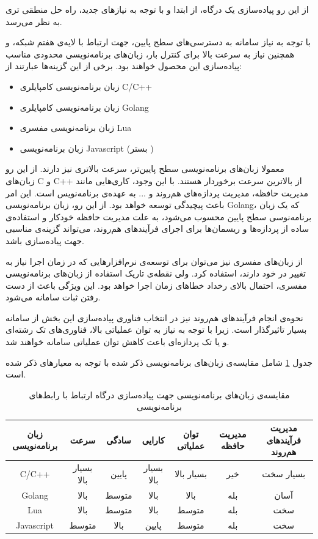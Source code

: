 از این رو پیاده‌سازی یک درگاه، از ابتدا و با توجه به نیاز‌های جدید،‌ راه حل منطقی تری به نظر می‌رسد.

با توجه به نیاز سامانه‌ به دسترسی‌های سطح پایین، جهت ارتباط با لایه‌ی هفتم شبکه، و همچنین نیاز به سرعت بالا برای کنترل بار، زبان‌های برنامه‌نویسی محدودی مناسب پیاده‌سازی این محصول خوا‌هند بود. برخی از این گزینه‌ها عبارتند از:

\begin{itemize}
    \item زبان برنامه‌نویسی کامپایلری C/C++
    \item زبان برنامه‌نویسی کامپایلری Golang
    \item زبان برنامه‌نویسی مفسری Lua
    \item زبان برنامه‌نویسی Javascript (بستر )
\end{itemize}

معمولا زبان‌های برنامه‌نویسی سطح پایین‌تر، سرعت بالاتری نیز دارند. از این رو زبان‌های C و C++ از بالاترین سرعت برخوردار هستند. با این وجود، کاری‌هایی مانند مدیریت حافظه، مدیریت پردازه‌های هم‌روند و ... به عهده‌ی برنامه‌نویس است. این امر باعث پیچیدگی توسعه خواهد بود. از این رو، زبان برنامه‌نویسی Golang، که یک زبان برنامه‌نوسی سطح‌ پایین محسوب می‌شود، به علت مدیریت حافظه خودکار و استفاده‌ی ساده از پردازه‌ها
و ریسمان‌ها
برای اجرای فرآیند‌های هم‌روند، می‌تواند گزینه‌ی مناسبی جهت پیاده‌سازی باشد.

از زبان‌های مفسری نیز می‌توان برای توسعه‌ی نرم‌افزار‌هایی که در زمان اجرا نیاز به تغییر در خود دارند، استفاده کرد. ولی نقطه‌ی تاریک استفاده ‌از زبان‌های برنامه‌نویسی مفسری، احتمال بالای رخداد خطا‌های زمان اجرا خواهد بود. این ویژگی باعث از دست رفتن ثبات سامانه می‌شود.

نحوه‌ی انجام فرآیند‌های هم‌روند نیز در انتخاب فناوری پیاده‌سازی این بخش از سامانه بسیار تاثیرگذار است. زیرا با توجه به نیاز به توان عملیاتی بالا، فناوری‌های تک رشته‌ای و یا تک‌ پردازه‌ای باعث کاهش توان عملیاتی سامانه خواهند شد.

جدول
\ref{tab:choice}
شامل مقایسه‌ی زبان‌های برنامه‌نویسی ذکر شده با توجه‌ به معیار‌های ذکر شده است.

\begin{table}[H]
    \centering
    \caption{مقایسه‌ی زبان‌های برنامه‌نویسی جهت پیاده‌سازی درگاه ارتباط با رابط‌های برنامه‌نویسی}\label{tab:choice}
    \begin{tabular}{|c|c|c|c|c|c|c|}
        \hline
        زبان برنامه‌نویسی & سرعت & سادگی & کارایی & توان عملیاتی & مدیریت حافظه & مدیریت فرآیند‌های هم‌روند\\
        \hline
        C/C++ & بسیار بالا & پایین & بسیار بالا & بسیار بالا & خیر & بسیار سخت\\
        \hline
        Golang & بالا & متوسط & بالا & بالا & بله & آسان\\
        \hline
        Lua & بالا & متوسط & بالا & متوسط & بله & سخت\\
        \hline
        Javascript & متوسط & بالا & پایین & متوسط & بله & سخت\\
        \hline
    \end{tabular}

\end{table}



